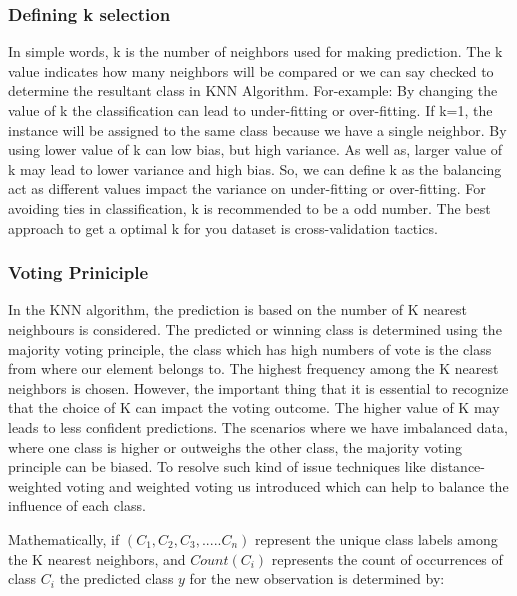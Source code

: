 \documentclass[conference]{IEEEtran}
\begin{document}
\subsubsection{Defining k selection}
In simple words, k is the number of neighbors used for making prediction. The k value indicates how many neighbors will be compared or we can say checked to determine the resultant class in KNN Algorithm. For-example: By changing the value of k the classification can lead to under-fitting or over-fitting. If k=1, the instance will be assigned to the same class because we have a single neighbor. By using lower value of k can low bias, but high variance. As well as, larger value of k may lead to lower variance and high bias. So, we can define k as the balancing act as different values impact the variance on under-fitting or over-fitting. For avoiding ties in classification, k is recommended to be a odd number. The best approach to get a optimal k for you dataset is cross-validation tactics.  


\subsubsection{Voting Priniciple}
In the KNN algorithm, the prediction is based on the number of K nearest neighbours is considered. The predicted or winning class is determined using the majority voting principle, the class which has high numbers of vote is the class from where our element belongs to. The highest frequency among the K nearest neighbors is chosen. However, the important thing that it is essential to recognize that the choice of K can impact the voting outcome. The higher value of K may leads to less confident predictions. The scenarios where we have imbalanced data, where one class is higher or outweighs the other class, the majority voting principle can be biased. To resolve such kind of issue techniques like distance-weighted voting and weighted voting us introduced which can help to balance the influence of each class. 

Mathematically, if 
\begin{math}
(C_1,C_2,C_3,.....C_n) 
\end{math}
represent the unique class labels among the K nearest neighbors, and 
\begin{math}
Count(C_i) 
\end{math}
represents the count of occurrences of class 
\begin{math}C_i\end{math}
the predicted class  
\begin{math} y \end{math}
for the new observation is determined by:
\end{document}
